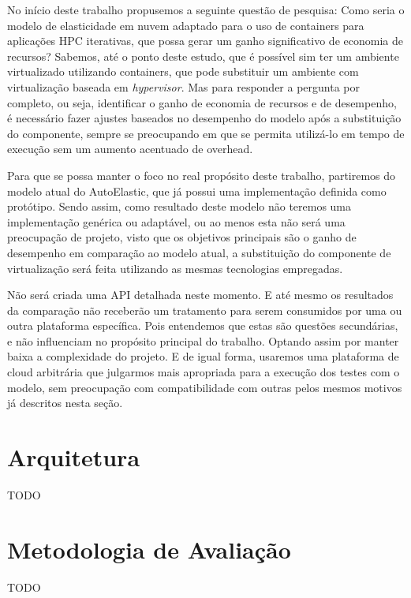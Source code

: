 \documentclass[twoside,english,brazilian]{UNISINOSmonografia}
\begin{document}
No início deste trabalho propusemos a seguinte questão de pesquisa: Como seria o modelo de elasticidade em nuvem adaptado para o uso de containers para aplicações HPC iterativas, que possa gerar um ganho significativo de economia de recursos? Sabemos, até o ponto deste estudo, que é possível sim ter um ambiente virtualizado utilizando containers, que pode substituir um ambiente com virtualização baseada em \textit{hypervisor}. Mas para responder a pergunta por completo, ou seja, identificar o ganho de economia de recursos e de desempenho, é necessário fazer ajustes baseados no desempenho do modelo após a substituição do componente, sempre se preocupando em que se permita utilizá-lo em tempo de execução sem um aumento acentuado de overhead.

Para que se possa manter o foco no real propósito deste trabalho, partiremos do modelo atual do AutoElastic, que já possui uma implementação definida como protótipo. Sendo assim, como resultado deste modelo não teremos uma implementação genérica ou adaptável, ou ao menos esta não será uma preocupação de projeto, visto que os objetivos principais são o ganho de desempenho em comparação ao modelo atual, a substituição do componente de virtualização será feita utilizando as mesmas tecnologias empregadas. 

Não será criada uma API detalhada neste momento. E até mesmo os resultados da comparação não receberão um tratamento para serem consumidos por uma ou outra plataforma específica. Pois entendemos que estas são questões secundárias, e não influenciam no propósito principal do trabalho. Optando assim por manter baixa a complexidade do projeto. E de igual forma, usaremos uma plataforma de cloud arbitrária que julgarmos mais apropriada para a execução dos testes com o modelo, sem preocupação com compatibilidade com outras pelos mesmos motivos já descritos nesta seção.

\section{Arquitetura}

TODO

\section{Metodologia de Avaliação}
TODO



\end{document}
